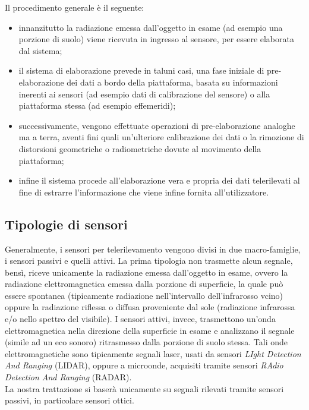 Il procedimento generale è il seguente:
\begin{itemize}
\item innanzitutto la radiazione emessa dall'oggetto in esame (ad esempio una porzione di suolo) viene ricevuta in ingresso al sensore, per essere elaborata dal sistema;
\item il sistema di elaborazione prevede in taluni casi, una fase iniziale di pre-elaborazione dei dati a bordo della piattaforma, basata su informazioni inerenti ai sensori (ad esempio dati di calibrazione del sensore) o alla piattaforma stessa (ad esempio effemeridi);
\item successivamente, vengono effettuate operazioni di pre-elaborazione analoghe ma a terra, aventi fini quali un'ulteriore calibrazione dei dati o la rimozione di distorsioni geometriche o radiometriche dovute al movimento della piattaforma;
\item infine il sistema procede all'elaborazione vera e propria dei dati telerilevati al fine di estrarre l'informazione che viene infine fornita all'utilizzatore.
\end{itemize}


\subsection{Tipologie di sensori}

Generalmente, i sensori per telerilevamento vengono divisi in due macro-famiglie, i sensori passivi e quelli attivi.
La prima tipologia non trasmette alcun segnale, bensì, riceve unicamente la radiazione emessa dall'oggetto in esame, ovvero la radiazione elettromagnetica emessa dalla porzione di superficie, la quale può essere spontanea (tipicamente radiazione nell'intervallo dell'infrarosso vcino) oppure la radiazione riflessa o diffusa proveniente dal sole (radiazione infrarossa e/o nello spettro del visibile).
I sensori attivi, invece, trasmettono un'onda elettromagnetica nella direzione della superficie in esame e analizzano il segnale (simile ad un eco sonoro) ritrasmesso dalla porzione di suolo stessa.
Tali onde elettromagnetiche sono tipicamente segnali laser, usati da sensori \emph{LIght Detection And Ranging} (LIDAR), oppure a microonde, acquisiti tramite sensori \emph{RAdio Detection And Ranging} (RADAR).
\\

La nostra trattazione si baserà unicamente su segnali rilevati tramite sensori passivi, in particolare sensori ottici.  


